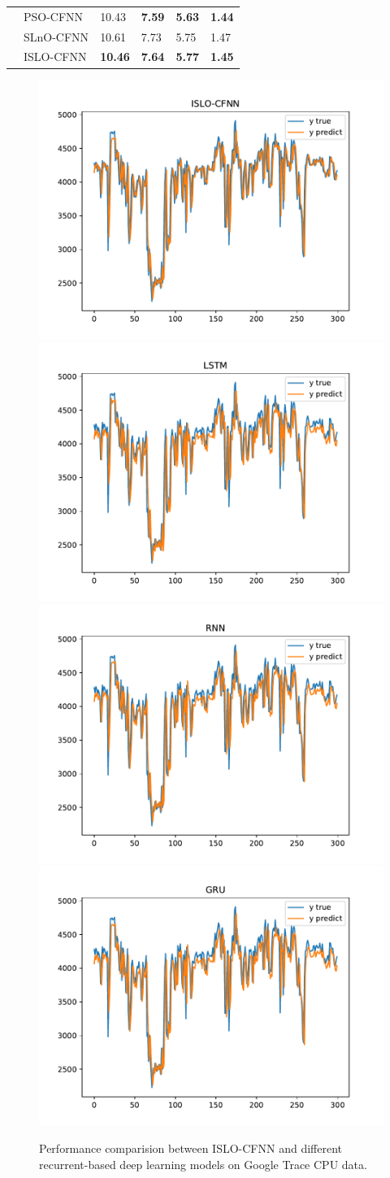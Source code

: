 \documentclass[a4paper,13pt,2p]{report}
\begin{document}
\begin{table}[!t]
\begin{tabular}{|l|l|l|l|l|l|}
                                     & PSO-CFNN  & 10.43           & \textbf{7.59}   & \textbf{5.63}  & \textbf{1.44} \\ \cline{2-6} 
                                     & SLnO-CFNN & 10.61           & 7.73            & 5.75           & 1.47          \\ \cline{2-6} 
                                     & ISLO-CFNN & \textbf{10.46}  & \textbf{7.64}   & \textbf{5.77}  & \textbf{1.45} \\ \hline
\end{tabular}
\end{table}


\begin{figure}[!ht] 
   \centering
   	\includegraphics[width=0.49\linewidth]{pdf/result_data/cpu/ISLO_CFNN_cpu}
  	 \includegraphics[width=0.49\linewidth]{pdf/result_data/cpu/LSTM_cpu}
  	 \includegraphics[width=0.49\linewidth]{pdf/result_data/cpu/RNN_cpu}
  	 \includegraphics[width=0.49\linewidth]{pdf/result_data/cpu/GRU_cpu}
	
  \caption{Performance comparision between ISLO-CFNN and different recurrent-based deep learning models on Google Trace CPU data.} 
  \label{fig_result_cpu_islo_rnn} 
\end{figure}
\end{document}
